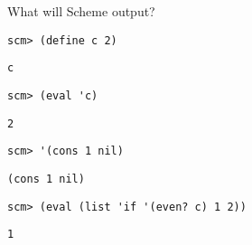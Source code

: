 \begin{blocksection}
\question What will Scheme output?

\begin{lstlisting}
scm> (define c 2)
\end{lstlisting}
\begin{solution}[0.25in]
\begin{lstlisting}
c
\end{lstlisting}
\end{solution}

\begin{lstlisting}
scm> (eval 'c)
\end{lstlisting}
\begin{solution}[0.25in]
\begin{lstlisting}
2
\end{lstlisting}
\end{solution}

\begin{lstlisting}
scm> '(cons 1 nil)
\end{lstlisting}
\begin{solution}[0.25in]
\begin{lstlisting}
(cons 1 nil)
\end{lstlisting}
\end{solution}

\begin{comment}
\begin{lstlisting}
scm> (eval '(cons 1 nil))
\end{lstlisting}
\begin{solution}[0.25in]
\begin{lstlisting}
(1)
\end{lstlisting}
\end{solution}
\end{comment}

\begin{lstlisting}
scm> (eval (list 'if '(even? c) 1 2))
\end{lstlisting}
\begin{solution}[0.25in]
\begin{lstlisting}
1
\end{lstlisting}
\end{solution}
\end{blocksection}

